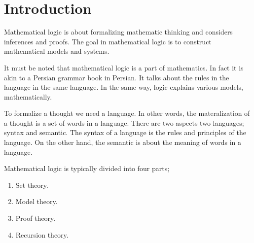 \chapter{Introduction}
Mathematical logic is about formalizing mathematic thinking and considers inferences and proofs. The goal in mathematical logic is to construct mathematical models and systems.

It must be noted that mathematical logic is a part of mathematics. In fact it is akin to a Persian grammar book in Persian. It talks about the rules in the language in the same language. In the same way, logic explains various models, mathematically. 

To formalize a thought we need a language. In other words, the materalization of a thought is a set of words in a language. There are two aspects two languages; syntax and semantic. The syntax of a language is the rules and principles of the language. On the other hand, the semantic is about the meaning of words in a language.

Mathematical logic is typically divided into four parts;
\begin{enumerate}
    \item Set theory.
    \item Model theory.
    \item Proof theory.
    \item Recursion theory.
\end{enumerate}

